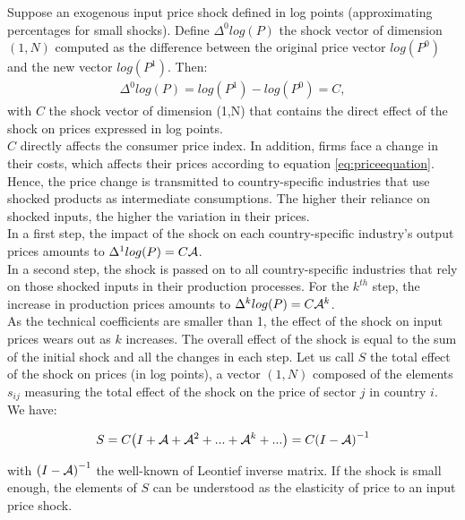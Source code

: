 \documentclass[11pt,a4paper]{article}
\begin{document}
Suppose an exogenous input price shock defined in log points (approximating percentages for small shocks). 
Define ${{\Delta }^{0}}log(P)$ the shock vector of dimension $(1, N)$ computed as the difference between the original price vector $log(P^0)$ and the new vector $log(P^1)$. Then:
\begin{eqnarray*}
\Delta ^0 log(P)=log(P^1)-log(P^0)=C, 
\end{eqnarray*}
with $C$ the shock vector of dimension (1,N) that contains the direct effect of the shock on prices expressed in log points.\\
$C$ directly affects the consumer price index.
In addition, firms face a change in their costs, which affects their prices according to equation \ref{eq:priceequation}.
Hence, the price change is transmitted to country-specific industries that use shocked products as intermediate consumptions. The higher their reliance on shocked inputs, the higher the variation in their prices.\\
In a first step, the impact of the shock on each country-specific industry's output prices amounts to $\Delta^{1}log(P)=C{\cal A}$.\\
In a second step, the shock is passed on to all country-specific industries that rely on those shocked inputs in their production processes. 
For the $k^{th}$ step, the increase in production prices amounts to $\Delta^k log(P)=C{\cal A}^k$.\\
As the technical coefficients are smaller than 1, the effect of the shock on input prices wears out as $k$ increases.
The overall effect of the shock is equal to the sum of the initial shock and all the changes in each step.
Let us call $S$ the total effect of the shock on prices (in log points), a vector $(1, N)$ composed of the elements $s_{ij}$ measuring the total effect of the shock on the price of sector $j$ in country $i$. We have: 

\begin{eqnarray}
S=C {\left( I+{\cal A}+{\cal A}^2+...+{\cal A}^k+...\right)} =C {\left( I-{\cal A} \right)}^{-1}
\label{eq:eqchocprix} 
\end{eqnarray}


with ${\left( I-{\cal A} \right)}^{-1}$ the well-known of Leontief inverse matrix. If the shock is small enough, the elements of $S$ can be understood as the elasticity of price to an input price shock. 
\end{document}
